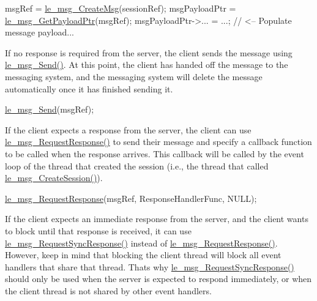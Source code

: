 \begin{DoxyCode}
msgRef = \hyperlink{le__messaging_8h_a8293a69f256b98cbce5b9990ea3520f3}{le\_msg\_CreateMsg}(sessionRef);
msgPayloadPtr = \hyperlink{le__messaging_8h_a32d1c7ffd913db8546f6f1bd5cce58c4}{le\_msg\_GetPayloadPtr}(msgRef);
msgPayloadPtr->... = ...; \textcolor{comment}{// <-- Populate message payload...}
\end{DoxyCode}


If no response is required from the server, the client sends the message using \hyperlink{le__messaging_8h_a073de097d281475c44a445b927fbb929}{le\+\_\+msg\+\_\+\+Send()}. At this point, the client has handed off the message to the messaging system, and the messaging system will delete the message automatically once it has finished sending it.


\begin{DoxyCode}
\hyperlink{le__messaging_8h_a073de097d281475c44a445b927fbb929}{le\_msg\_Send}(msgRef);
\end{DoxyCode}


If the client expects a response from the server, the client can use \hyperlink{le__messaging_8h_a5440ae06a89b60ed04e9de5601496608}{le\+\_\+msg\+\_\+\+Request\+Response()} to send their message and specify a callback function to be called when the response arrives. This callback will be called by the event loop of the thread that created the session (i.\+e., the thread that called \hyperlink{le__messaging_8h_a696d7c2d4e3725d3ddb5dd2d79d2d732}{le\+\_\+msg\+\_\+\+Create\+Session()}).


\begin{DoxyCode}
\hyperlink{le__messaging_8h_a5440ae06a89b60ed04e9de5601496608}{le\_msg\_RequestResponse}(msgRef, ResponseHandlerFunc, NULL);
\end{DoxyCode}


If the client expects an immediate response from the server, and the client wants to block until that response is received, it can use \hyperlink{le__messaging_8h_aa3cf113b26b154697ccef270dafe8798}{le\+\_\+msg\+\_\+\+Request\+Sync\+Response()} instead of \hyperlink{le__messaging_8h_a5440ae06a89b60ed04e9de5601496608}{le\+\_\+msg\+\_\+\+Request\+Response()}. However, keep in mind that blocking the client thread will block all event handlers that share that thread. That\textquotesingle{}s why \hyperlink{le__messaging_8h_aa3cf113b26b154697ccef270dafe8798}{le\+\_\+msg\+\_\+\+Request\+Sync\+Response()} should only be used when the server is expected to respond immediately, or when the client thread is not shared by other event handlers.


